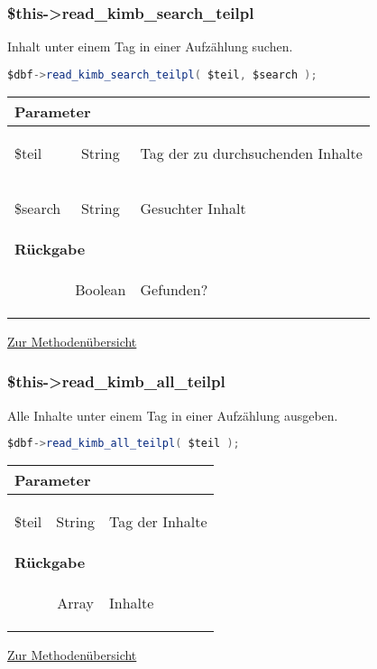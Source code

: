 \documentclass[paper=A4,pagesize=auto,12pt,headinclude=true,footinclude=true,BCOR=0mm,DIV=calc]{scrartcl}
\begin{document}
%
  \subsubsection{\$this->read\_kimb\_search\_teilpl}
  \label{sec:mth_search_tpl}
	    Inhalt unter einem Tag in einer Aufzählung suchen.
	    \begin{lstlisting}[gobble=4,language=Java]
	      $dbf->read_kimb_search_teilpl( $teil, $search );
	    \end{lstlisting}
	    
	    \begin{tabular}{|lcp{}|}
		    \hline
		      \multicolumn{3}{|l|}{ \textbf{Parameter} } \\
		    \hline
		      \$teil & String & \begin{itshape} Tag der zu durchsuchenden Inhalte \end{itshape} \\
		      \$search & String & \begin{itshape} Gesuchter Inhalt \end{itshape} \\
		    \hline
		      \multicolumn{3}{|l|}{ \textbf{Rückgabe} } \\
		    \hline
			     & Boolean & \begin{itshape} Gefunden? \end{itshape} \\
		    \hline
	    \end{tabular}
	    \begin{flushright} \small \hyperref[tab:methodenuerbersicht]{Zur Methodenübersicht} \end{flushright}
  
  \subsubsection{\$this->read\_kimb\_all\_teilpl}
  \label{sec:mth_all_tpl}
	    Alle Inhalte unter einem Tag in einer Aufzählung ausgeben.
	    \begin{lstlisting}[gobble=4,language=Java]
	      $dbf->read_kimb_all_teilpl( $teil );
	    \end{lstlisting}
	    
	     \begin{tabular}{|lcp{}|}
		    \hline
		      \multicolumn{3}{|l|}{ \textbf{Parameter} } \\
		    \hline
		      \$teil & String & \begin{itshape} Tag der Inhalte \end{itshape} \\
		    \hline
		      \multicolumn{3}{|l|}{ \textbf{Rückgabe} } \\
		    \hline
			     & Array & \begin{itshape} Inhalte \end{itshape} \\
		    \hline
	    \end{tabular}
	    \begin{flushright} \small \hyperref[tab:methodenuerbersicht]{Zur Methodenübersicht} \end{flushright}
  
\end{document}
